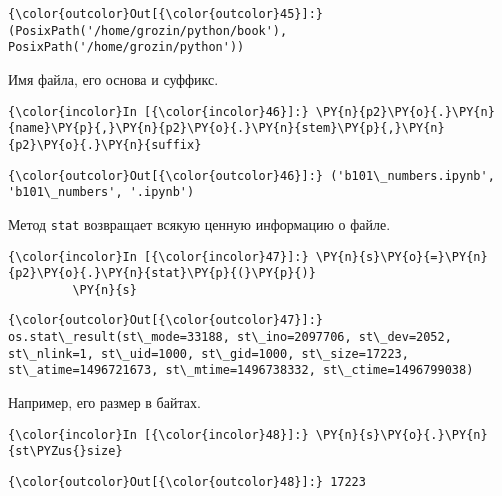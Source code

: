             \begin{Verbatim}[commandchars=\\\{\}]
{\color{outcolor}Out[{\color{outcolor}45}]:} (PosixPath('/home/grozin/python/book'), PosixPath('/home/grozin/python'))
\end{Verbatim}
        
    Имя файла, его основа и суффикс.

    \begin{Verbatim}[commandchars=\\\{\}]
{\color{incolor}In [{\color{incolor}46}]:} \PY{n}{p2}\PY{o}{.}\PY{n}{name}\PY{p}{,}\PY{n}{p2}\PY{o}{.}\PY{n}{stem}\PY{p}{,}\PY{n}{p2}\PY{o}{.}\PY{n}{suffix}
\end{Verbatim}

            \begin{Verbatim}[commandchars=\\\{\}]
{\color{outcolor}Out[{\color{outcolor}46}]:} ('b101\_numbers.ipynb', 'b101\_numbers', '.ipynb')
\end{Verbatim}
        
    Метод \texttt{stat} возвращает всякую ценную информацию о файле.

    \begin{Verbatim}[commandchars=\\\{\}]
{\color{incolor}In [{\color{incolor}47}]:} \PY{n}{s}\PY{o}{=}\PY{n}{p2}\PY{o}{.}\PY{n}{stat}\PY{p}{(}\PY{p}{)}
         \PY{n}{s}
\end{Verbatim}

            \begin{Verbatim}[commandchars=\\\{\}]
{\color{outcolor}Out[{\color{outcolor}47}]:} os.stat\_result(st\_mode=33188, st\_ino=2097706, st\_dev=2052, st\_nlink=1, st\_uid=1000, st\_gid=1000, st\_size=17223, st\_atime=1496721673, st\_mtime=1496738332, st\_ctime=1496799038)
\end{Verbatim}
        
    Например, его размер в байтах.

    \begin{Verbatim}[commandchars=\\\{\}]
{\color{incolor}In [{\color{incolor}48}]:} \PY{n}{s}\PY{o}{.}\PY{n}{st\PYZus{}size}
\end{Verbatim}

            \begin{Verbatim}[commandchars=\\\{\}]
{\color{outcolor}Out[{\color{outcolor}48}]:} 17223
\end{Verbatim}
        

